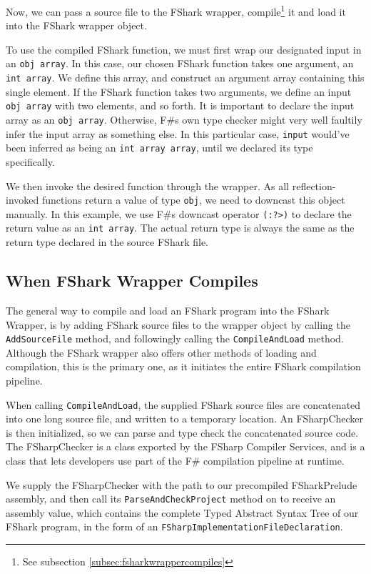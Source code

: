 Now, we can pass a source file to the FShark wrapper, compile\footnote{See
  subsection \ref{subsec:fsharkwrappercompiles}} it and load it into the FShark wrapper object.

To use the compiled FShark function, we must first wrap our designated input in
an \texttt{obj array}. In this case, our chosen FShark function takes one
argument, an \texttt{int array}. We define this array, and construct an argument
array containing this single element. If the FShark function takes two
arguments, we define an input \texttt{obj array} with two elements, and so
forth.
It is important to declare the input array as an \texttt{obj array}. Otherwise,
F\#s own type checker might very well faultily infer the input array as
something else. In this particular case, \texttt{input} would've been inferred
as being an \texttt{int array array}, until we declared its type specifically.

We then invoke the desired function through the wrapper. As all
reflection-invoked functions return a value of type \texttt{obj}, we need to
downcast this object manually.
In this example, we use F\#s downcast operator \texttt{(:?>)} to declare the
return value as an \texttt{int array}. The actual return type is always the same as the
return type declared in the source FShark file.

\subsection{When FShark Wrapper Compiles}
\label{sec:fsharkwrappercompiles}
The general way to compile and load an FShark program into the FShark Wrapper,
is by adding FShark source files to the wrapper object by calling the
\texttt{AddSourceFile} method, and followingly calling the \texttt{CompileAndLoad}
method. Although the FShark wrapper also offers other methods of loading and
compilation, this is the primary one, as it initiates the entire FShark
compilation pipeline.

When calling \texttt{CompileAndLoad}, the supplied FShark source files are
concatenated into one long source file, and written to a temporary location.
An FSharpChecker is then initialized, so we can parse and type check the
concatenated source code. The FSharpChecker is a class exported by the FSharp
Compiler Services, and is a class that lets developers use part of the F\#
compilation pipeline at runtime.

We supply the FSharpChecker with the path to our precompiled FSharkPrelude
assembly, and then call its \texttt{ParseAndCheckProject} method on to receive
an assembly value, which contains the complete Typed Abstract Syntax Tree of our
FShark program, in the form of an \texttt{FSharpImplementationFileDeclaration}.

